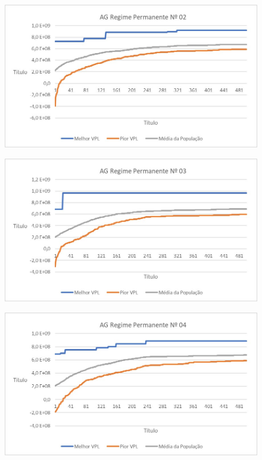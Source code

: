\documentclass[12pt,a4paper]{report}
\begin{document}
\begin{figure}[H]
\centering

\includegraphics[scale=1]{AGRP/2}

\end{figure}
\begin{figure}[H]
\centering

\includegraphics[scale=1]{AGRP/3}

\end{figure}
\begin{figure}[H]
\centering

\includegraphics[scale=1]{AGRP/4}

\end{figure}
\end{document}
